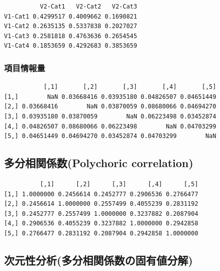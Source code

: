 \documentclass[
  a4paper,
]{ltjsbook}
\newenvironment{Shaded}{\begin{snugshade}}{\end{snugshade}}
\newcommand{\NormalTok}[1]{\textcolor[rgb]{0.00,0.23,0.31}{#1}}
\newcommand{\SpecialCharTok}[1]{\textcolor[rgb]{0.37,0.37,0.37}{#1}}
\begin{document}
\begin{verbatim}
          V2-Cat1   V2-Cat2   V2-Cat3
V1-Cat1 0.4299517 0.4009662 0.1690821
V1-Cat2 0.2635135 0.5337838 0.2027027
V1-Cat3 0.2581818 0.4763636 0.2654545
V1-Cat4 0.1853659 0.4292683 0.3853659
\end{verbatim}

\subsubsection{項目情報量}\label{ux9805ux76eeux60c5ux5831ux91cf-1}

\begin{Shaded}
\end{Shaded}

\begin{verbatim}
           [,1]       [,2]       [,3]       [,4]       [,5]
[1,]        NaN 0.03668416 0.03935180 0.04826507 0.04651449
[2,] 0.03668416        NaN 0.03870059 0.08680066 0.04694270
[3,] 0.03935180 0.03870059        NaN 0.06223498 0.03452874
[4,] 0.04826507 0.08680066 0.06223498        NaN 0.04703299
[5,] 0.04651449 0.04694270 0.03452874 0.04703299        NaN
\end{verbatim}

\subsection{多分相関係数(Polychoric
correlation)}\label{ux591aux5206ux76f8ux95a2ux4fc2ux6570polychoric-correlation}

\begin{Shaded}
\end{Shaded}

\begin{verbatim}
          [,1]      [,2]      [,3]      [,4]      [,5]
[1,] 1.0000000 0.2456614 0.2452777 0.2906536 0.2766477
[2,] 0.2456614 1.0000000 0.2557499 0.4055239 0.2831192
[3,] 0.2452777 0.2557499 1.0000000 0.3237882 0.2087904
[4,] 0.2906536 0.4055239 0.3237882 1.0000000 0.2942858
[5,] 0.2766477 0.2831192 0.2087904 0.2942858 1.0000000
\end{verbatim}

\subsection{次元性分析(多分相関係数の固有値分解)}\label{ux6b21ux5143ux6027ux5206ux6790ux591aux5206ux76f8ux95a2ux4fc2ux6570ux306eux56faux6709ux5024ux5206ux89e3}
\end{document}
